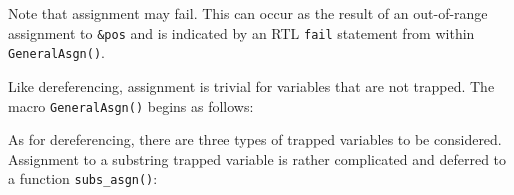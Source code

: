 \goodbreak
{}

Note that assignment may fail. This can occur as the result of an
out-of-range assignment to \texttt{\&pos} and is indicated by an RTL
\texttt{fail} statement from within \texttt{GeneralAsgn()}.

Like dereferencing, assignment is trivial for variables that are not
trapped. The macro \texttt{GeneralAsgn()} begins as follows:

\goodbreak
{}

As for dereferencing, there are three types of trapped variables to be
considered. Assignment to a substring trapped variable is rather
complicated and deferred to a function \texttt{subs\_asgn()}:

